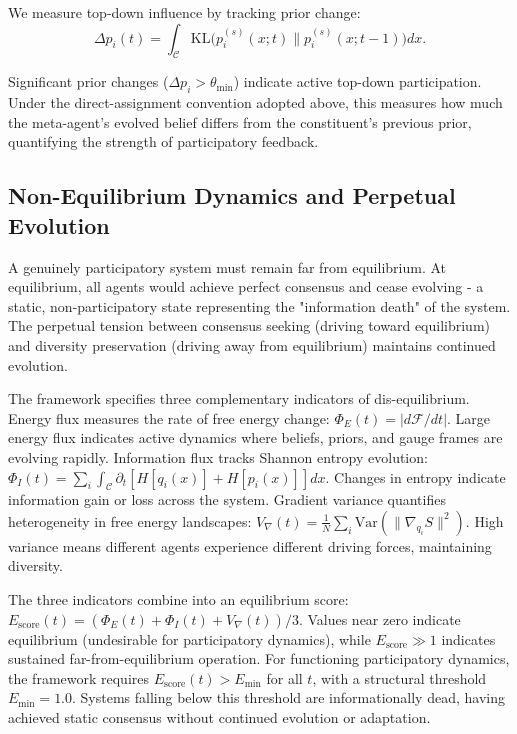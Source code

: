 \documentclass[11pt]{article}
\begin{document}
We measure top-down influence by tracking prior change:
\begin{equation}
\Delta p_i(t) = \int_{\mathcal{C}} \mathrm{KL}\big(p_i^{(s)}(x; t) \| p_i^{(s)}(x; t-1)\big)  dx.
\end{equation}

Significant prior changes ($\Delta p_i > \theta_{\min}$) indicate active top-down participation. Under the direct-assignment convention adopted above, this measures how much the meta-agent's evolved belief differs from the constituent's previous prior, quantifying the strength of participatory feedback.

\subsection{Non-Equilibrium Dynamics and Perpetual Evolution}

A genuinely participatory system must remain far from equilibrium. At equilibrium, all agents would achieve perfect consensus and cease evolving - a static, non-participatory state representing the "information death" of the system. The perpetual tension between consensus seeking (driving toward equilibrium) and diversity preservation (driving away from equilibrium) maintains continued evolution.

The framework specifies three complementary indicators of dis-equilibrium. Energy flux measures the rate of free energy change: $\Phi_E(t) = |d\mathcal{F}/dt|$. Large energy flux indicates active dynamics where beliefs, priors, and gauge frames are evolving rapidly. Information flux tracks Shannon entropy evolution: $\Phi_I(t) = \sum_i \int_{\mathcal{C}} \partial_t[H[q_i(x)] + H[p_i(x)]] dx$. Changes in entropy indicate information gain or loss across the system. Gradient variance quantifies heterogeneity in free energy landscapes: $V_{\nabla}(t) = \frac{1}{N}\sum_i \mathrm{Var}(\|\nabla_{q_i} S\|^2)$. High variance means different agents experience different driving forces, maintaining diversity.

The three indicators combine into an equilibrium score: $E_{\mathrm{score}}(t) = (\Phi_E(t) + \Phi_I(t) + V_{\nabla}(t))/3$. Values near zero indicate equilibrium (undesirable for participatory dynamics), while $E_{\mathrm{score}} \gg 1$ indicates sustained far-from-equilibrium operation. For functioning participatory dynamics, the framework requires $E_{\mathrm{score}}(t) > E_{\min}$ for all $t$, with a structural threshold $E_{\min} = 1.0$. Systems falling below this threshold are informationally dead, having achieved static consensus without continued evolution or adaptation.
\end{document}
